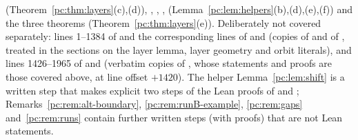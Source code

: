 (Theorem~\ref{pc:thm:layers}(c),(d)), , , ,
 (Lemma~\ref{pc:lem:helpers}(b),(d),(e),(f)) and the three  theorems
(Theorem~\ref{pc:thm:layers}(e)). Deliberately not covered separately: lines 1--1384 of  and the
corresponding lines of  and  (copies of 
and of , treated in the sections on the layer lemma, layer geometry and orbit
literals), and lines 1426--1965 of  and  (verbatim copies of
, whose statements and proofs are those covered above, at line offset $+1420$).
The helper Lemma~\ref{pc:lem:shift} is a written step that makes explicit two  steps of the Lean proofs
of  and ; Remarks~\ref{pc:rem:alt-boundary}, \ref{pc:rem:runB-example}, \ref{pc:rem:gaps} and~\ref{pc:rem:runs} contain
further written steps (with proofs) that are not Lean statements.
\par\endgroup
